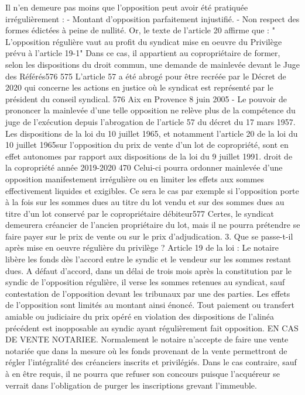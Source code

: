 Il n'en demeure pas moins que l'opposition peut avoir été pratiquée irrégulièrement :
- Montant d'opposition parfaitement injustifié.
- Non respect des formes édictées à peine de nullité.
Or, le texte de l'article 20 affirme que :
" L'opposition régulière vaut au profit du syndicat mise en oeuvre du Privilège prévu à l'article 19-1"
Dans ce cas, il appartient au copropriétaire de former, selon les dispositions du droit commun, une demande de mainlevée devant le Juge des Référés576
575 L’article 57 a été abrogé pour être recréée par le Décret de 2020 qui concerne les actions en justice où le syndicat est représenté par le président du conseil syndical. 576 Aix en Provence 8 juin 2005 - Le pouvoir de prononcer la mainlevée d'une telle opposition ne relève plus de la compétence du juge de l'exécution depuis l'abrogation de l'article 57 du décret du 17 mars 1957. Les dispositions de la loi du 10 juillet 1965, et notamment l'article 20 de la loi du 10 juillet 1965sur l'opposition du prix de vente d'un lot de copropriété, sont en effet autonomes par rapport aux dispositions de la loi du 9 juillet 1991.
droit de la copropriété année 2019-2020
470
Celui-ci pourra ordonner mainlevée d'une opposition manifestement irrégulière ou en limiter les effets aux sommes effectivement liquides et exigibles. Ce sera le cas par exemple si l’opposition porte à la fois sur les sommes dues au titre du lot vendu et sur des sommes dues au titre d’un lot conservé par le copropriétaire débiteur577
Certes, le syndicat demeurera créancier de l'ancien propriétaire du lot, mais il ne pourra prétendre se faire payer sur le prix de vente ou sur le prix d'adjudication.
3. Que se passe-t-il après mise en oeuvre régulière du privilège ?
Article 19 de la loi :
Le notaire libère les fonds dès l'accord entre le syndic et le vendeur sur les sommes restant dues. A défaut d'accord, dans un délai de trois mois après la constitution par le syndic de l'opposition régulière, il verse les sommes retenues au syndicat, sauf contestation de l'opposition devant les tribunaux par une des parties. Les effets de l'opposition sont limités au montant ainsi énoncé.
Tout paiement ou transfert amiable ou judiciaire du prix opéré en violation des dispositions de l'alinéa précédent est inopposable au syndic ayant régulièrement fait opposition.
EN CAS DE VENTE NOTARIEE.
Normalement le notaire n'accepte de faire une vente notariée que dans la mesure où les fonds provenant de la vente permettront de régler l'intégralité des créanciers inscrits et privilégiés.
Dans le cas contraire, sauf à en être requis, il ne pourra que refuser son concours puisque l'acquéreur se verrait dans l'obligation de purger les inscriptions grevant l'immeuble.

